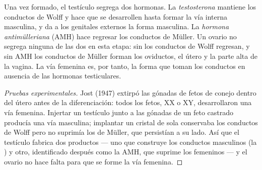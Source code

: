 \begin{proposition}\label{prop:g11:becoming-male-female:hormones}
Una vez formado, el testículo segrega dos hormonas. La
\emph{testosterona} mantiene los conductos de Wolff
y hace que se desarrollen hasta formar la vía interna masculina, y da a
los genitales externos la forma masculina. La \emph{hormona
antimülleriana} (AMH) hace regresar los conductos de Müller. Un ovario
no segrega ninguna de las dos en esta etapa: sin  los
conductos de Wolff regresan, y sin AMH los conductos de Müller forman
los oviductos, el útero y la parte alta de la vagina. La vía femenina
es, por tanto, la forma que toman los conductos en ausencia de las
hormonas testiculares.
\end{proposition}
\begin{proof}[Pruebas experimentales]
Jost (1947) extirpó las gónadas de fetos de conejo dentro del útero
antes de la diferenciación: todos los fetos, XX o XY, desarrollaron una
vía femenina. Injertar un testículo junto a las gónadas de un feto
castrado producía una vía masculina; implantar un cristal de
 sola conservaba los conductos de Wolff pero no suprimía
los de Müller, que persistían a su lado. Así que el testículo fabrica
dos productos --- uno que construye los conductos masculinos (la
) y otro, identificado después como la AMH, que suprime los
femeninos --- y el ovario no hace falta para que se forme la vía
femenina.
\end{proof}

